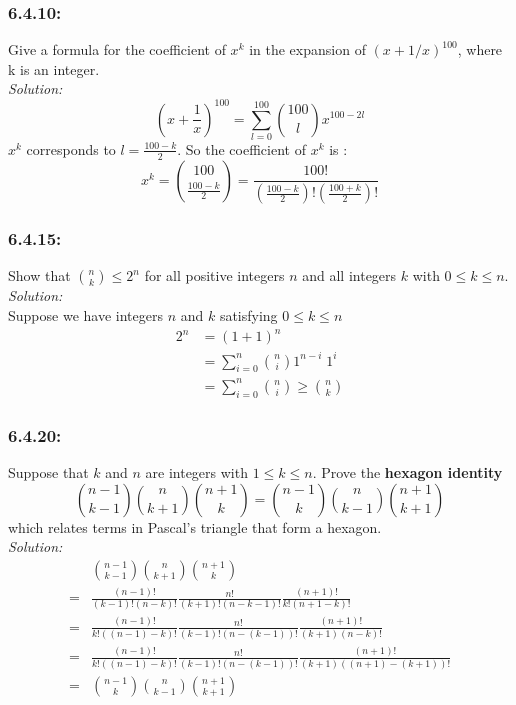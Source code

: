 \documentclass[a4paper]{article}
\begin{document}
\subsubsection*{6.4.10:}
Give a formula for the coefficient of $x^{k}$ in the expansion of $(x + 1/x)^{100}$, where k is an integer. \\
\emph{Solution:}
\begin{equation*}
	(x + \frac{1}{x})^{100} = \sum_{l = 0}^{100} {100 \choose l} x^{100 - 2l}
\end{equation*}
$x^{k}$ corresponds to $l = \frac{100-k}{2}$. So the coefficient of $x^{k}$ is :
\begin{equation*}
	x^{k} = {100 \choose {\frac{100-k}{2}}} = \frac{100!}{(\frac{100-k}{2})!(\frac{100+k}{2})!}
\end{equation*}
\subsubsection*{6.4.15:}
Show that ${n \choose k} \leq 2^n$ for all positive integers $n$ and all integers $k$ with $0 \leq k \leq n$.\\
\textit{Solution:}\\
Suppose we have integers $n$ and $k$ satisfying $0 \leq k \leq n$
\begin{align*}
	2^n & = (1+1)^n                                         \\
	    & = \sum_{i=0}^{n} {n \choose i} 1^{n-i}\;1^i       \\
	    & = \sum_{i=0}^{n} {n \choose i} \geq {n \choose k}
\end{align*}

\subsubsection*{6.4.20:}
Suppose that $k$ and $n$ are integers with $1 \leq k \leq n$. Prove the \textbf{hexagon identity}
\begin{equation*}
	{n-1 \choose k-1}{n \choose k+1}{n+1 \choose k} = {n-1 \choose k}{n \choose k-1}{n+1 \choose k+1}
\end{equation*}
which relates terms in Pascal's triangle that form a hexagon. \\
\textit{Solution:} \\
\begin{align*}
	  & {n-1 \choose k-1}{n \choose k+1}{n+1 \choose k}                                            \\
	= & \frac{(n-1)!}{(k-1)!(n-k)!} \frac{n!}{(k+1)!(n-k-1)!} \frac{(n+1)!}{k!(n+1-k)!}            \\
	= & \frac{(n-1)!}{k!((n-1)-k)!} \frac{n!}{(k-1)!(n-(k-1))!} \frac{(n+1)!}{(k+1)(n-k)!}         \\
	= & \frac{(n-1)!}{k!((n-1)-k)!} \frac{n!}{(k-1)!(n-(k-1))!} \frac{(n+1)!}{(k+1)((n+1)-(k+1))!} \\
	= & {n-1 \choose k}{n \choose k-1}{n+1 \choose k+1}
\end{align*}
\end{document}
